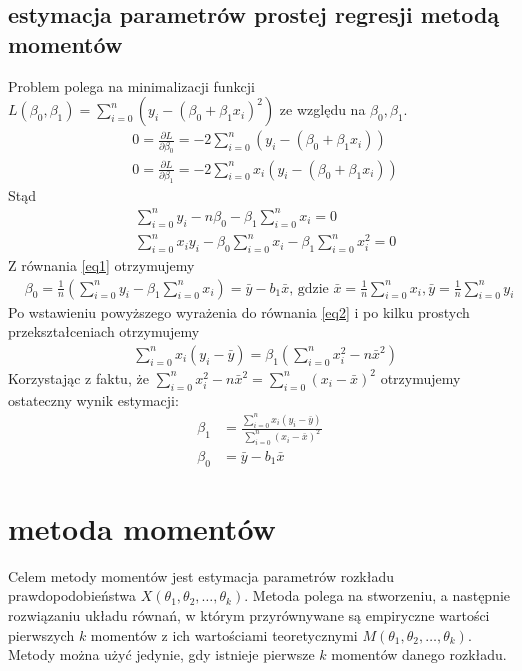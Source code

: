 \documentclass[inzynierska]{pwr_wmat_praca_dyplomowa}
\theoremstyle{plain}
\numberwithin{theorem}{chapter}
\theoremstyle{definition}
\numberwithin{theorem}{chapter}
\begin{document}
\subsection{estymacja parametrów prostej regresji metodą momentów}
Problem polega na minimalizacji funkcji $L(\beta_0, \beta_1) = \sum_{i=0}^{n}\left(y_i - \left(\beta_0 + \beta_1 x_i\right)^2 \right)$ ze względu na $\beta_0, \beta_1$.
\begin{align}
	& 0 = \frac{\partial L}{\partial \beta_0} = -2\sum_{i=0}^{n}\left(y_i - \left(\beta_0 + \beta_1 x_i\right)\right) \\
	& 0 = \frac{\partial L}{\partial \beta_1} = -2\sum_{i=0}^{n}x_i\left(y_i - \left(\beta_0 + \beta_1 x_i\right)\right)
\end{align}
Stąd
\begin{align}
	& \sum_{i=0}^{n}y_i - n \beta_0 - \beta_1\sum_{i=0}^{n} x_i = 0 \label{eq1}\\
	& \sum_{i=0}^{n} x_i y_i - \beta_0 \sum_{i=0}^{n}x_i - \beta_1\sum_{i=0}^{n} x_i^2 = 0 \label{eq2}
\end{align}
Z równania \ref{eq1} otrzymujemy
\begin{align}
	& \beta_0 = \frac{1}{n} \left(\sum_{i=0}^{n}y_i - \beta_1\sum_{i=0}^{n} x_i\right) = \bar{y} - b_1 \bar{x}\text{, gdzie } \bar{x}= \frac{1}{n}\sum_{i=0}^{n} x_i, \bar{y}= \frac{1}{n}\sum_{i=0}^{n} y_i
\end{align}
Po wstawieniu powyższego wyrażenia do równania \ref{eq2} i po kilku prostych przekształceniach otrzymujemy 
\begin{align}
	& \sum_{i=0}^{n}x_i(y_i - \bar{y}) = \beta_1 \left(\sum_{i=0}^{n}x_i^2 - n\bar{x}^2 \right)
\end{align}
Korzystając z faktu, że $\sum_{i=0}^{n}x_i^2 - n\bar{x}^2 = \sum_{i=0}^{n}(x_i-\bar{x})^2$ otrzymujemy ostateczny wynik estymacji:
\begin{align}
	\beta_1& =  \frac{\sum_{i=0}^{n}x_i(y_i - \bar{y})}{\sum_{i=0}^{n}(x_i-\bar{x})^2}\\
	\beta_0& =  \bar{y} - b_1\bar{x}
\end{align}
\section{metoda momentów}
Celem metody momentów \cite{momentowametoda} jest estymacja parametrów rozkładu prawdopodobieństwa $X(\theta_1, \theta_2, \dots, \theta_k)$. Metoda polega na stworzeniu, a następnie rozwiązaniu układu równań, w którym przyrównywane są empiryczne wartości pierwszych $k$ momentów z ich wartościami teoretycznymi $M(\theta_1, \theta_2, \dots, \theta_k)$. Metody można użyć jedynie, gdy istnieje pierwsze $k$ momentów danego rozkładu.
\end{document}
